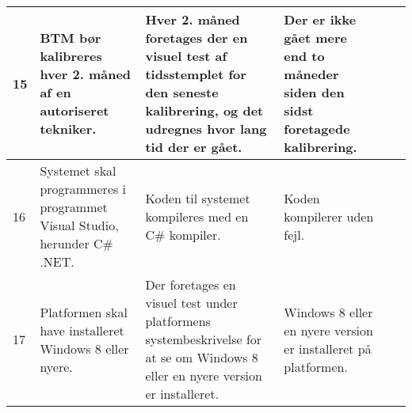 \begin{table}[H]
\begin{tabular}{|p{0.5cm}|p{4cm}|p{3cm}|p{3cm}|p{3cm}|p{1cm}|}
 15 & BTM bør kalibreres hver 2. måned af en autoriseret tekniker. & Hver 2. måned foretages der en visuel test af tidsstemplet for den seneste kalibrering, og det udregnes hvor lang tid der er gået.& Der er ikke gået mere end to måneder siden den sidst foretagede kalibrering. & & \\\hline
 16 & Systemet skal programmeres i programmet Visual Studio, herunder C\# .NET. & Koden til systemet kompileres med en C# kompiler. & Koden kompilerer uden fejl. & & \\\hline
 17 & Platformen skal have installeret Windows 8 eller nyere. &Der foretages en visuel test under platformens systembeskrivelse for at se om Windows 8 eller en nyere version er installeret. & Windows 8 eller en nyere version er installeret på platformen. & & \\\hline 
\end{tabular}
\end{table}
